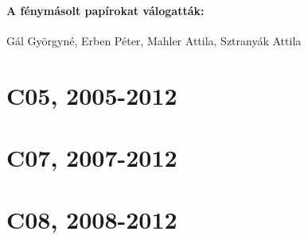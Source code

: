 \documentclass[twoside]{book}
\begin{document}
\subsection*{A fénymásolt papírokat válogatták:}  

Gál Györgyné, Erben Péter, Mahler Attila, Sztranyák Attila



\tableofcontents


\mainmatter
\part*{C05, 2005-2012}


\part*{C07, 2007-2012}


\part*{C08, 2008-2012}

\end{document}
